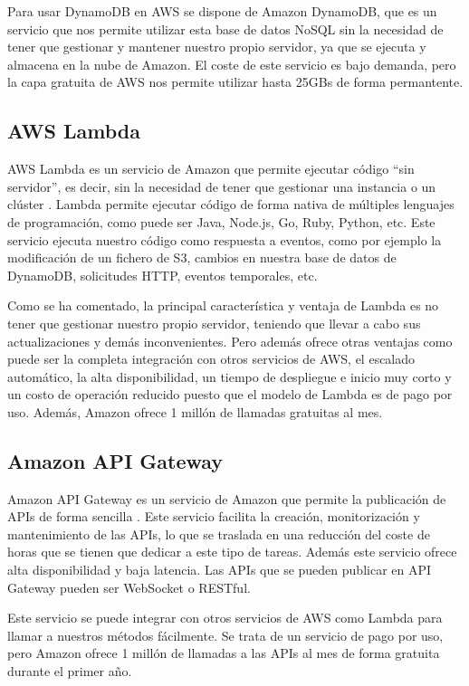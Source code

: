 Para usar DynamoDB en AWS se dispone de Amazon DynamoDB, que es un servicio que nos permite utilizar esta base de datos NoSQL sin la necesidad de tener que gestionar y mantener nuestro propio servidor, ya que se ejecuta y almacena en la nube de Amazon. El coste de este servicio es bajo demanda, pero la capa gratuita de AWS nos permite utilizar hasta 25GBs de forma permantente.

\subsection{AWS Lambda}

AWS Lambda es un servicio de Amazon que permite ejecutar código ``sin servidor'', es decir, sin la necesidad de tener que gestionar una instancia o un clúster \cite{aws_lambda}. Lambda permite ejecutar código de forma nativa de múltiples lenguajes de programación, como puede ser Java, Node.js, Go, Ruby, Python, etc. Este servicio ejecuta nuestro código como respuesta a eventos, como por ejemplo la modificación de un fichero de S3, cambios en nuestra base de datos de DynamoDB, solicitudes HTTP, eventos temporales, etc. 

Como se ha comentado, la principal característica y ventaja de Lambda es no tener que gestionar nuestro propio servidor, teniendo que llevar a cabo sus actualizaciones y demás inconvenientes. Pero además ofrece otras ventajas como puede ser la completa integración con otros servicios de AWS, el escalado automático, la alta disponibilidad, un tiempo de despliegue e inicio muy corto y un costo de operación reducido puesto que el modelo de Lambda es de pago por uso. Además, Amazon ofrece 1 millón de llamadas gratuitas al mes.

\subsection{Amazon API Gateway}

Amazon API Gateway es un servicio de Amazon que permite la publicación de APIs de forma sencilla \cite{aws_apigateway}. Este servicio facilita la creación, monitorización y mantenimiento de las APIs, lo que se traslada en una reducción del coste de horas que se tienen que dedicar a este tipo de tareas. Además este servicio ofrece alta disponibilidad y baja latencia. Las APIs que se pueden publicar en API Gateway pueden ser WebSocket o RESTful.

Este servicio se puede integrar con otros servicios de AWS como Lambda para llamar a nuestros métodos fácilmente. Se trata de un servicio de pago por uso, pero Amazon ofrece 1 millón de llamadas a las APIs al mes de forma gratuita durante el primer año.

